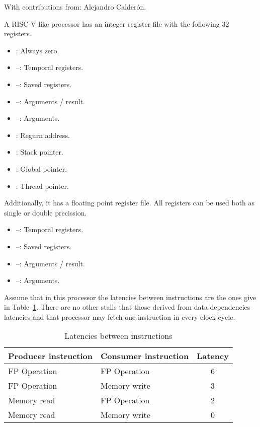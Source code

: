 \begin{acexercise}
With contributions from: Alejandro Calderón.
\end{acexercise}

A RISC-V like processor has an integer register file with the following 32 registers.

\begin{itemize}
  \item {}: Always zero.
  \item {}--: Temporal registers.
  \item {}--: Saved registers.
  \item {}--: Arguments / result.
  \item {}--: Arguments.
  \item {}: Regurn address.
  \item {}: Stack pointer.
  \item {}: Global pointer.
  \item {}: Thread pointer.
\end{itemize}

Additionally, it has a floating point register file.
All registers can be used both as single or double precission.

\begin{itemize}
  \item {}--: Temporal registers.
  \item {}--: Saved registers.
  \item {}--: Arguments / result.
  \item {}--: Arguments.
\end{itemize}

Assume that in this processor the latencies between instructions are the ones
give in Table~\ref{tab:unroll-1:latencies}. 
There are no other stalls that those derived from data dependencies latencies
and that processor may fetch one instruction in every clock cycle.

\begin{table}[htb]
\begin{tabular}{|l|l|c|}
\hline
\textbf{Producer instruction} &
\textbf{Consumer instruction} &
\textbf{Latency}
\\
\hline

FP Operation & FP Operation & 6\\
\hline

FP Operation & Memory write & 3\\
\hline

Memory read & FP Operation & 2\\
\hline

Memory read & Memory write & 0\\
\hline

\end{tabular}
\caption{Latencies between instructions}
\label{tab:unroll-1:latencies}
\end{table}

